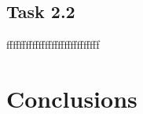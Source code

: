 \documentclass[a4paper,11pt,oneside]{book}
\begin{document}
\section{Task 2.2}
fffffffffffffffffffffffffffff
\chapter*{Conclusions}

% 


\end{document}
